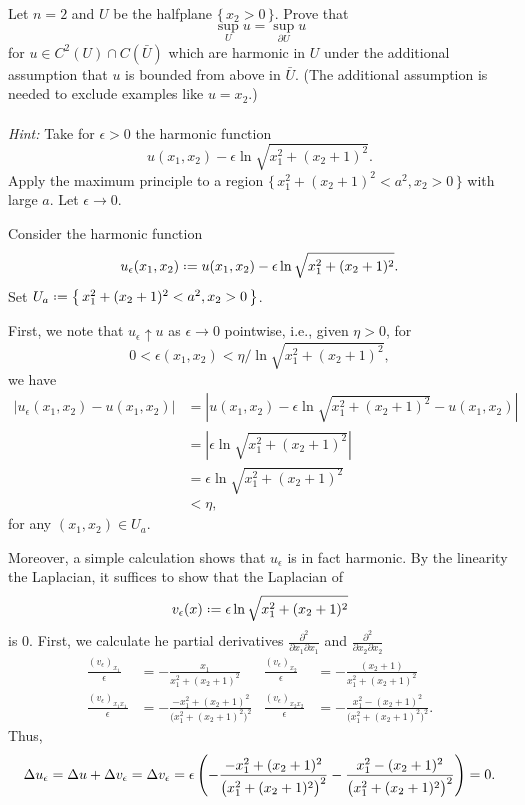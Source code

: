 \begin{problem}
  Let \(n=2\) and \(U\) be the halfplane \(\{\,x_2>0\,\}\). Prove that
  \[
    \sup_U u=\sup_{\partial U}u
  \]
  for \(u\in C^2(U)\cap C(\bar U)\) which are harmonic in \(U\) under the
  additional assumption that \(u\) is bounded from above in \(\bar
  U\). (The additional assumption is needed to exclude examples like
  \(u=x_2\).)
  \\\\
  \emph{Hint:} Take for \(\epsilon>0\) the harmonic function
  \[
    u(x_1,x_2)-\epsilon\ln\sqrt{x_1^2+(x_2+1)^2}.
  \]
  Apply the maximum principle to a region
  \(\bigl\{\,x_1^2+(x_2+1)^2<a^2,x_2>0\,\bigr\}\) with large \(a\). Let
  \(\epsilon\to 0\).
\end{problem}
\begin{solution*}
  Consider the harmonic function
  \[
    u_\epsilon(x_1,x_2)\defeq
    u(x_1,x_2)-\epsilon\ln\sqrt{x_1^2+(x_2+1)^2}.
  \]
  Set \(U_a\defeq \bigl\{\,x_1^2+(x_2+1)^2<a^2,x_2>0\,\bigr\}\).

  First, we note that \(u_\epsilon\uparrow u\) as \(\epsilon\to 0\)
  pointwise, i.e., given \(\eta>0\), for
  \[
    0<\epsilon(x_1,x_2)<\eta/{\ln\sqrt{x_1^2+(x_2+1)^2}},
  \]
  we have
  \begin{align*}
    |u_\epsilon(x_1,x_2)-u(x_1,x_2)|
    &=\left|
      u(x_1,x_2)-\epsilon\ln\sqrt{x_1^2+(x_2+1)^2}
      -u(x_1,x_2)
      \right|\\
    &=\left|
      \epsilon\ln\sqrt{x_1^2+(x_2+1)^2}
      \right|\\
    &=\epsilon\ln\sqrt{x_1^2+(x_2+1)^2}\\
    &<\eta,
  \end{align*}
  for any \((x_1,x_2)\in U_a\).

  Moreover, a simple calculation shows that \(u_\epsilon\) is in fact
  harmonic. By the linearity the Laplacian, it suffices to show that the
  Laplacian of
  \[
    v_\epsilon(x)\defeq\epsilon\ln\sqrt{x_1^2+(x_2+1)^2}%
  \]
  is \(0\). First, we calculate he partial derivatives
  \(\frac{\partial^2}{\partial x_1\partial x_1}\) and
  \(\frac{\partial^2}{\partial x_2\partial x_2}\)
  \begin{align*}
   \frac{(v_\epsilon)_{x_1}}{\epsilon}
    &=-\frac{x_1}{x_1^2+(x_2+1)^2}
    &\frac{(v_\epsilon)_{x_2}}{\epsilon}
    &=-\frac{(x_2+1)}{x_1^2+(x_2+1)^2}\\
    \frac{(v_{\epsilon})_{x_1x_1}}{\epsilon}
    &=-\frac{-x_1^2+(x_2+1)^2}{\bigl(x_1^2+(x_2+1)^2\bigr)^2}
    &\frac{(v_{\epsilon})_{x_2x_2}}{\epsilon}
    &=-\frac{x_1^2-(x_2+1)^2}{\bigl(x_1^2+(x_2+1)^2\bigr)^2}.
  \end{align*}
  Thus,
  \[
    \Lap u_\epsilon=\Lap u+\Lap v_\epsilon=
    \Lap v_\epsilon=\epsilon
    \left(
      -\frac{-x_1^2+(x_2+1)^2}{\bigl(x_1^2+(x_2+1)^2\bigr)^2}
      -\frac{x_1^2-(x_2+1)^2}{\bigl(x_1^2+(x_2+1)^2\bigr)^2}
    \right)=0.
  \]


\end{solution*}
